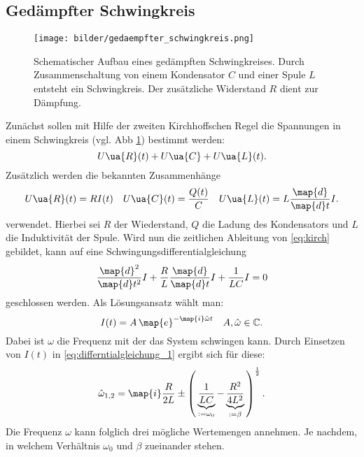 \subsection{Gedämpfter Schwingkreis}
\begin{figure}
  \centering
  \texttt{[image: bilder/gedaempfter\_schwingkreis.png]}
  \caption{Schematischer Aufbau eines gedämpften Schwingkreises.
  Durch Zusammenschaltung von einem Kondensator $C$ und einer Spule $L$ entsteht ein Schwingkreis.
  Der zusätzliche Widerstand $R$ dient zur Dämpfung\cite{anleitung354}.}
  \label{fig:gedaempft}
  \end{figure}
Zunächst sollen mit Hilfe der zweiten %
Kirchhoffschen Regel die Spannungen in einem Schwingkreis (vgl. Abb \ref{fig:gedaempft}) %
bestimmt werden:
\begin{equation}
  \label{eq:kirch}
U\ua{R}(t)+U\ua{C}+U\ua{L}(t).
\end{equation}
Zusätzlich werden die bekannten Zusammenhänge %
\begin{equation*}
U\ua{R}(t)=RI(t) \quad U\ua{C}(t)=\frac{Q(t)}{C} \quad U\ua{L}(t)=L\frac{\map{d}}{\map{d}t}I.
\end{equation*}
verwendet.
Hierbei sei $R$ der Wiederstand, $Q$ die Ladung des Kondensators und $L$ die Induktivität der Spule.
Wird nun die zeitlichen Ableitung von \eqref{eq:kirch} gebildet, kann auf eine Schwingungsdifferentialgleichung %
\begin{equation}
  \label{eq:differntialgleichung_1}
\frac{\map{d}^2}{\map{d}t^2}I+\frac{R}{L}\frac{\map{d}}{\map{d}t}I+\frac{1}{LC}I=0
\end{equation}
geschlossen werden.
Als Lösungsansatz wählt man:
\begin{equation*}
  I(t)=A\,\map{e}^{-\map{i}\hat{\omega} t} \quad A,\hat{\omega}\in\mathbb{C}.
\end{equation*}
Dabei ist $\omega$ die Frequenz mit der das System schwingen kann.
Durch Einsetzen von $I(t)$ in \eqref{eq:differntialgleichung_1} ergibt sich %
für diese:
\begin{equation}
  \label{eq:omega_gedaempft}
  \hat{\omega}_{1,2}=\map{i}\frac{R}{2L}\pm\left(\,\underbrace{\frac{1}{LC}}_{:=\omega_0}-\underbrace{\frac{R^2}{4L^2}}_{:=\beta}\,\right)^{\frac{1}{2}}.
\end{equation}
 Die Frequenz $\omega$ kann folglich drei mögliche Wertemengen annehmen.
 Je nachdem, in welchem Verhältnis $\omega_0$ und $\beta$ zueinander stehen.  %
\\
